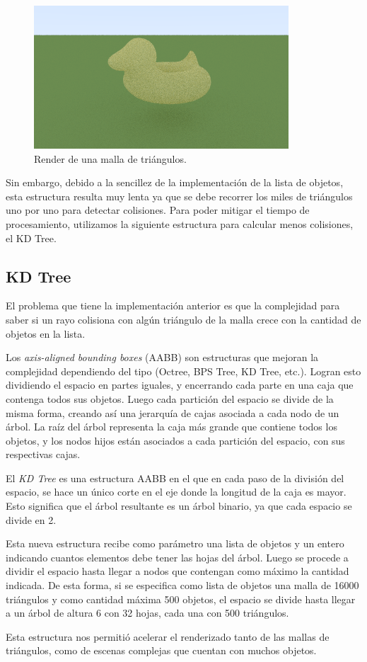 \begin{figure}[H]
    \centering
    \includegraphics[width=.9\textwidth]{imgs/escena_malla_pato}
    \caption{Render de una malla de triángulos.}
    \label{fig:escena_malla_pato}
\end{figure}

Sin embargo, debido a la sencillez de la implementación de la lista de objetos, esta estructura
resulta muy lenta ya que se debe recorrer los miles de triángulos uno por uno para detectar
colisiones.
Para poder mitigar el tiempo de procesamiento, utilizamos la siguiente estructura para calcular
menos colisiones, el KD Tree.

\subsection{KD Tree} \label{subsec:kd_tree}

El problema que tiene la implementación anterior es que la complejidad para saber si un rayo
colisiona con algún triángulo de la malla crece con la cantidad de objetos en la lista.

Los \textit{axis-aligned bounding boxes} (AABB) son estructuras que mejoran la complejidad
dependiendo del tipo (Octree, BPS Tree, KD Tree, etc.).
Logran esto dividiendo el espacio en partes iguales, y encerrando cada parte en una caja que
contenga todos sus objetos.
Luego cada partición del espacio se divide de la misma forma, creando así una jerarquía de cajas
asociada a cada nodo de un árbol.
La raíz del árbol representa la caja más grande que contiene todos los objetos, y los nodos hijos
están asociados a cada partición del espacio, con sus respectivas cajas.

El \textit{KD Tree} es una estructura AABB en el que en cada paso de la división del espacio, se
hace un único corte en el eje donde la longitud de la caja es mayor.
Esto significa que el árbol resultante es un árbol binario, ya que cada espacio se divide en 2.

Esta nueva estructura recibe como parámetro una lista de objetos y un entero indicando
cuantos elementos debe tener las hojas del árbol.
Luego se procede a dividir el espacio hasta llegar a nodos que contengan como máximo la cantidad
indicada.
De esta forma, si se especifica como lista de objetos una malla de 16000 triángulos y como cantidad
máxima 500 objetos, el espacio se divide hasta llegar a un árbol de altura 6 con 32 hojas, cada una
con 500 triángulos.

Esta estructura nos permitió acelerar el renderizado tanto de las mallas de triángulos, como de
escenas complejas que cuentan con muchos objetos.
